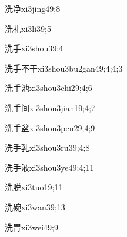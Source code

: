 \begin{verbete}{洗净}{xi3jing4}{9;8}
\end{verbete}

\begin{verbete}{洗礼}{xi3li3}{9;5}
\end{verbete}

\begin{verbete}{洗手}{xi3shou3}{9;4}
\end{verbete}

\begin{verbete}{洗手不干}{xi3shou3bu2gan4}{9;4;4;3}
\end{verbete}

\begin{verbete}{洗手池}{xi3shou3chi2}{9;4;6}
\end{verbete}

\begin{verbete}{洗手间}{xi3shou3jian1}{9;4;7}
\end{verbete}

\begin{verbete}{洗手盆}{xi3shou3pen2}{9;4;9}
\end{verbete}

\begin{verbete}{洗手乳}{xi3shou3ru3}{9;4;8}
\end{verbete}

\begin{verbete}{洗手液}{xi3shou3ye4}{9;4;11}
\end{verbete}

\begin{verbete}{洗脱}{xi3tuo1}{9;11}
\end{verbete}

\begin{verbete}{洗碗}{xi3wan3}{9;13}
\end{verbete}

\begin{verbete}{洗胃}{xi3wei4}{9;9}
\end{verbete}

